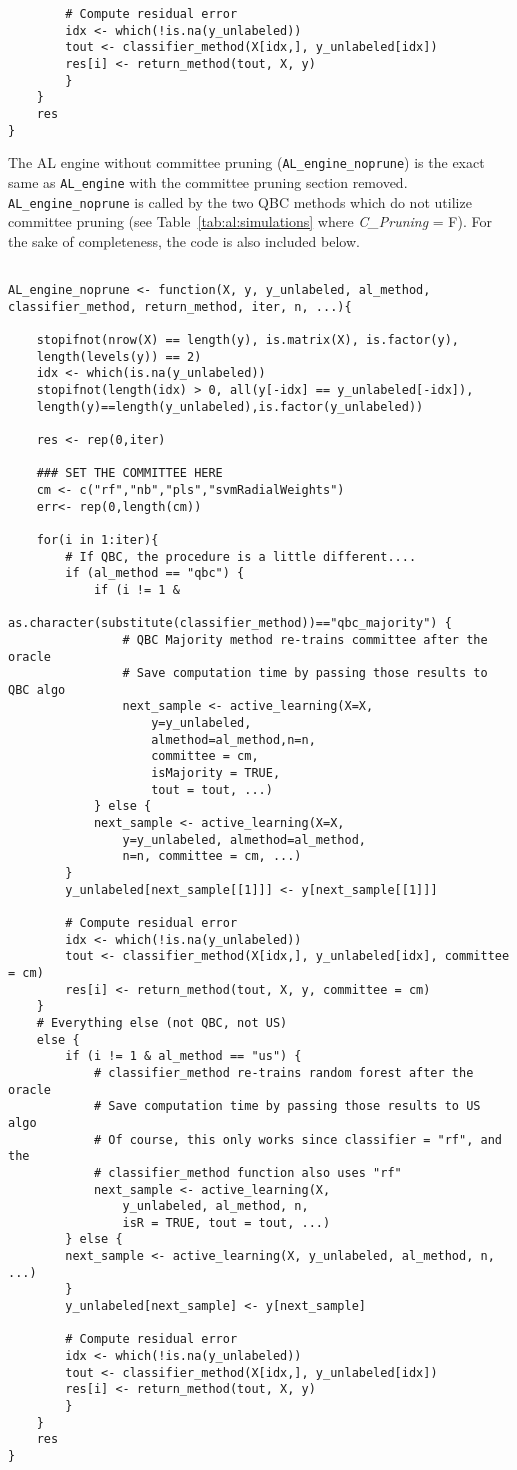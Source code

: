 {\begin{lstlisting}
		# Compute residual error
		idx <- which(!is.na(y_unlabeled))
		tout <- classifier_method(X[idx,], y_unlabeled[idx])
		res[i] <- return_method(tout, X, y)
		}
	}
	res
}
\end{lstlisting}
}

The AL engine without committee pruning (\texttt{AL\_engine\_noprune}) is the 
exact same as \texttt{AL\_engine} with the committee pruning section removed. 
\texttt{AL\_engine\_noprune} is called by the two QBC methods which do not 
utilize committee pruning (see Table~\ref{tab:al:simulations} where 
\textit{C\_Pruning} = F). For the sake of completeness, the code is also 
included below.

{
\begin{lstlisting}

AL_engine_noprune <- function(X, y, y_unlabeled, al_method,
classifier_method, return_method, iter, n, ...){
	
	stopifnot(nrow(X) == length(y), is.matrix(X), is.factor(y), 
	length(levels(y)) == 2)
	idx <- which(is.na(y_unlabeled))
	stopifnot(length(idx) > 0, all(y[-idx] == y_unlabeled[-idx]), 
	length(y)==length(y_unlabeled),is.factor(y_unlabeled))
	
	res <- rep(0,iter)
	
	### SET THE COMMITTEE HERE
	cm <- c("rf","nb","pls","svmRadialWeights")
	err<- rep(0,length(cm))
	
	for(i in 1:iter){
		# If QBC, the procedure is a little different....
		if (al_method == "qbc") {
			if (i != 1 & 
			as.character(substitute(classifier_method))=="qbc_majority") {
				# QBC Majority method re-trains committee after the oracle
				# Save computation time by passing those results to QBC algo
				next_sample <- active_learning(X=X,
					y=y_unlabeled,
					almethod=al_method,n=n, 
					committee = cm, 
					isMajority = TRUE, 
					tout = tout, ...)
			} else {
			next_sample <- active_learning(X=X,
				y=y_unlabeled, almethod=al_method, 
				n=n, committee = cm, ...)
		}
		y_unlabeled[next_sample[[1]]] <- y[next_sample[[1]]]
		
		# Compute residual error
		idx <- which(!is.na(y_unlabeled))
		tout <- classifier_method(X[idx,], y_unlabeled[idx], committee = cm)
		res[i] <- return_method(tout, X, y, committee = cm)
	}
	# Everything else (not QBC, not US)
	else {
		if (i != 1 & al_method == "us") {
			# classifier_method re-trains random forest after the oracle
			# Save computation time by passing those results to US algo
			# Of course, this only works since classifier = "rf", and the
			# classifier_method function also uses "rf"
			next_sample <- active_learning(X, 
				y_unlabeled, al_method, n, 
				isR = TRUE, tout = tout, ...)
		} else {
		next_sample <- active_learning(X, y_unlabeled, al_method, n, ...)
		}
		y_unlabeled[next_sample] <- y[next_sample]
		
		# Compute residual error
		idx <- which(!is.na(y_unlabeled))
		tout <- classifier_method(X[idx,], y_unlabeled[idx])
		res[i] <- return_method(tout, X, y)
		}
	}
	res
}
\end{lstlisting}
}

